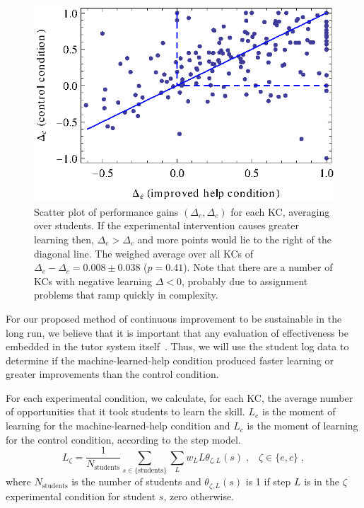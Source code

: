 \documentclass{edm_template}
\begin{document}
\begin{figure}
   \centering\includegraphics{scatter-gain.eps}
   \caption{Scatter plot of performance gains $\left(\Delta_e,\Delta_c\right)$
   for each KC, averaging over students.  If the experimental intervention
   causes greater learning then, $\Delta_e > \Delta_c$ and more points
   would lie to the right of the diagonal line.
   The weighed average over all KCs of $\Delta_e - \Delta_c = 
        0.008\pm 0.038$ ($p=0.41$).
   Note that there are a number
   of KCs with negative learning $\Delta<0$, probably due to 
   assignment problems that ramp quickly in complexity. 
   }\label{scattergain}
\end{figure}

For our proposed method of continuous improvement to be sustainable in
the long run, we believe that it is important that any evaluation of
effectiveness be embedded in the tutor system
itself~\cite{vanlehn_intelligent_2008}.  Thus, we will use the student
log data to determine if the machine-learned-help condition produced faster
learning or greater improvements than the control condition.

For each experimental condition, we calculate, for each KC, the
average number of opportunities that it took students to learn the
skill.  $L_e$ is the moment of learning for the machine-learned-help condition
and $L_c$ is the moment of learning for the control condition,
according to the step model.
%
\begin{equation}
L_\zeta = \frac{1}{N_\mbox{students}}\sum_{s \in \{\mbox{students}\}}
\sum_L w_L L \theta_{\zeta,L}(s) \;, \;\;\; \zeta \in \{e,c\} \; ,
\end{equation}
where $N_\mbox{students}$ is the number of students and 
$\theta_{\zeta,L}(s)$ is 1 if step $L$ is in the $\zeta$ experimental
condition for student $s$, zero otherwise.
\end{document}
